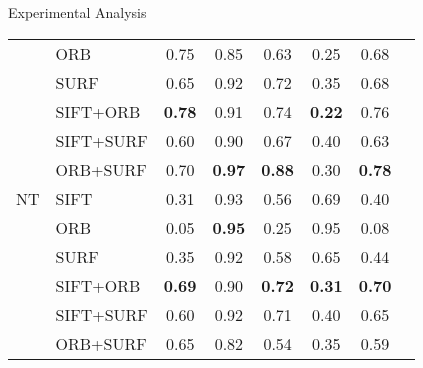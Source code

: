 \documentclass [9pt,times] {beamer}
\begin{document}
\begin{frame}[plain]{Experimental Analysis}
\begin{table}[t!]
\begin{tabular}{|c|l|c|c|c|c|c|c|}
    &    ORB    &    0.75    &    0.85    &    0.63    &    0.25    &    0.68    \\
    &    SURF    &    0.65    &    0.92    &    0.72    &    0.35    &    0.68    \\
    &    SIFT+ORB    &\textbf{    0.78    }&    0.91    &    0.74    &\textbf{    0.22    }&    0.76    \\
    &    SIFT+SURF    &    0.60    &    0.90    &    0.67    &    0.40    &    0.63    \\
    &    ORB+SURF    &    0.70    &\textbf{    0.97    }&\textbf{    0.88    }&    0.30    &\textbf{    0.78    }\\
\hline
NT    &    SIFT    &    0.31    &    0.93    &    0.56    &    0.69    &    0.40    \\
    &    ORB    &    0.05    &\textbf{    0.95    }&    0.25    &    0.95    &    0.08    \\
    &    SURF    &    0.35    &    0.92    &    0.58    &    0.65    &    0.44    \\
    &    SIFT+ORB    &\textbf{    0.69    }&    0.90    &\textbf{    0.72    }&\textbf{    0.31    }&\textbf{    0.70    }\\
    &    SIFT+SURF    &    0.60    &    0.92    &    0.71    &    0.40    &    0.65    \\
    &    ORB+SURF    &    0.65    &    0.82    &    0.54    &    0.35    &    0.59    \\
\hline    
    \end{tabular}
\end{table}
\end{frame}
\end{document}
